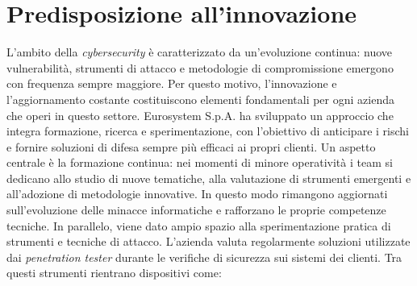 \section{Predisposizione all'innovazione}

L'ambito della \textit{cybersecurity} è caratterizzato da un'evoluzione continua: nuove vulnerabilità, strumenti di attacco e metodologie di compromissione emergono con frequenza sempre maggiore. Per questo motivo, l'innovazione e l'aggiornamento costante costituiscono elementi fondamentali per ogni azienda che operi in questo settore. Eurosystem S.p.A. ha sviluppato un approccio che integra formazione, ricerca e sperimentazione, con l'obiettivo di anticipare i rischi e fornire soluzioni di difesa sempre più efficaci ai propri clienti.  
Un aspetto centrale è la formazione continua: nei momenti di minore operatività i team si dedicano allo studio di nuove tematiche, alla valutazione di strumenti emergenti e all'adozione di metodologie innovative. In questo modo rimangono aggiornati sull'evoluzione delle minacce informatiche e rafforzano le proprie competenze tecniche.  
In parallelo, viene dato ampio spazio alla sperimentazione pratica di strumenti e tecniche di attacco. L'azienda valuta regolarmente soluzioni utilizzate dai \textit{penetration tester} durante le verifiche di sicurezza sui sistemi dei clienti. Tra questi strumenti rientrano dispositivi come:
